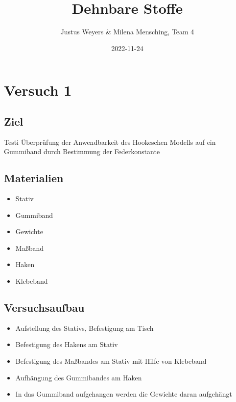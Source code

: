 \documentclass[
  9pt,
]{article}
\title{Dehnbare Stoffe}
\author{Justus Weyers \& Milena Mensching, Team 4}
\date{2022-11-24}
\providecommand{\tightlist}{%
  \setlength{\itemsep}{0pt}\setlength{\parskip}{0pt}}
\begin{document}
\maketitle

\hypertarget{versuch-1}{%
\section{Versuch 1}\label{versuch-1}}

\hypertarget{ziel}{%
\subsection{Ziel}\label{ziel}}

Testi Überprüfung der Anwendbarkeit des Hookeschen Modells auf ein
Gummiband durch Bestimmung der Federkonstante

\hypertarget{materialien}{%
\subsection{Materialien}\label{materialien}}

\begin{itemize}
\tightlist
\item
  Stativ
\item
  Gummiband
\item
  Gewichte
\item
  Maßband
\item
  Haken
\item
  Klebeband
\end{itemize}

\hypertarget{versuchsaufbau}{%
\subsection{Versuchsaufbau}\label{versuchsaufbau}}

\begin{itemize}
\tightlist
\item
  Aufstellung des Stativs, Befestigung am Tisch
\item
  Befestigung des Hakens am Stativ
\item
  Befestigung des Maßbandes am Stativ mit Hilfe von Klebeband
\item
  Aufhängung des Gummibandes am Haken
\item
  In das Gummiband aufgehangen werden die Gewichte daran aufgehängt
\end{itemize}
\end{document}
